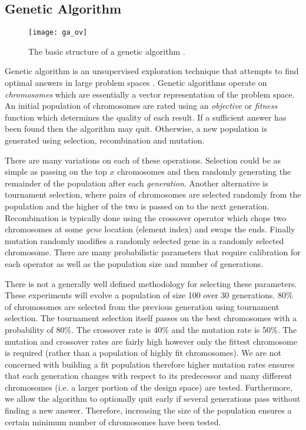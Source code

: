 \subsection{Genetic Algorithm}
\begin{figure}[h]
\centering
\texttt{[image: ga\_ov]}
\caption{The basic structure of a genetic algorithm \cite{geatbx}.}
\label{f:ga_ov}
\end{figure}

	Genetic algorithm is an unsupervised exploration technique that attempts to find optimal answers in large problem spaces \cite{geatbx}. 
	Genetic algorithms operate on \emph{chromosomes} which are essentially a vector representation of the problem space.
	An initial population of chromosomes are rated using an \emph{objective} or \emph{fitness} function which determines the quality of each result. 
	If a sufficient answer has been found then the algorithm may quit.
	Otherwise, a new population is generated using selection, recombination and mutation. 
	
	There are many variations on each of these operations. Selection could be as simple as passing on the top $x$ chromosomes and then randomly generating the remainder of the population after each \emph{generation}. 
	Another alternative is tournament selection, where pairs of chromosomes are selected randomly from the population and the higher of the two is passed on to the next generation. 
	Recombination is typically done using the crossover operator which chops two chromosomes at some \emph{gene} location (element index) and swaps the ends.
	Finally mutation randomly modifies a randomly selected gene in a randomly selected chromosome.
	There are many probabilistic parameters that require calibration for each operator as well as the population size and number of generations.
	
	There is not a generally well defined methodology for selecting these parameters. These experiments will evolve a population of size 100 over 30 generations. 80\% of chromosomes are selected from the previous generation using tournament selection. The tournament selection itself passes on the best chromosomes with a probability of 80\%. The crossover rate is 40\% and the mutation rate is 50\%. The mutation and crossover rates are fairly high however only the fittest chromosome is required (rather than a population of highly fit chromosomes). We are not concerned with building a fit population therefore higher mutation rates ensures that each generation changes with respect to its predecessor and many different chromosomes  (i.e. a larger portion of the design space) are tested. Furthermore, we allow the algorithm to optionally quit early if several generations pass without finding a new answer. Therefore, increasing the size of the population ensures a certain minimum number of chromosomes have been tested.

